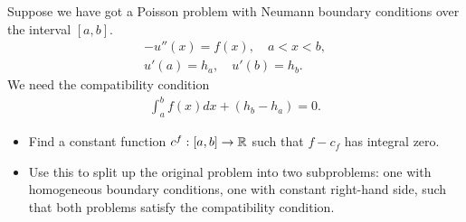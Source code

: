 \documentclass[11pt]{article}
\begin{document}
\begin{exercise}
    Suppose we have got a Poisson problem with Neumann boundary conditions over the interval $[a,b]$. 
    \begin{gather*}
        - u''(x) = f(x), \quad a < x < b,
        \\
        u'(a) = h_a, \quad u'(b) = h_b.
    \end{gather*}
    We need the compatibility condition 
    \begin{gather*}
        \int_a^b f(x) dx + ( h_b - h_a ) = 0.
    \end{gather*}
    \begin{itemize}
        \item
        Find a constant function $c^f : [a,b] \to \mathbb{R}$ such that $f - c_f$ has integral zero.
        \item
        Use this to split up the original problem into two subproblems: 
        one with homogeneous boundary conditions, one with constant right-hand side, such that both problems satisfy the compatibility condition.
    \end{itemize}
\end{exercise}
\begin{solution}     
\end{solution}
\end{document}

